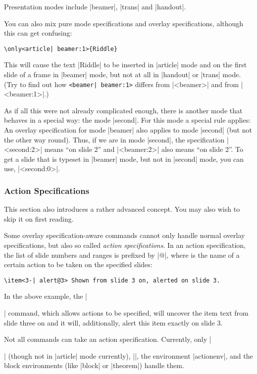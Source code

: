 Presentation modes include |beamer|, |trans| and |handout|.

You can also mix pure mode specifications and overlay specifications, although this can get confusing:
\begin{verbatim}
\only<article| beamer:1>{Riddle}
\end{verbatim}

This will cause the text |Riddle| to be inserted in |article| mode and on the first slide of a frame in |beamer| mode, but not at all in |handout| or |trans| mode. (Try to find out how \verb/<beamer| beamer:1>/ differs from |<beamer>| and from |<beamer:1>|.)

As if all this were not already complicated enough, there is another mode that behaves in a special way: the mode |second|. For this mode a special rule applies: An overlay specification for mode |beamer| also applies to mode |second| (but not the other way round). Thus, if we are in mode |second|, the specification |<second:2>| means ``on slide 2'' and |<beamer:2>| also means ``on slide 2''. To get a slide that is typeset in |beamer| mode, but not in |second| mode, you can use, |<second:0>|.

\subsubsection{Action Specifications}
\label{section-action-specifications}

This section also introduces a rather advanced concept. You may also wish to skip it on first reading.

Some overlay specification-aware commands cannot only handle normal overlay specifications, but also so called \emph{action specifications}. In an action specification, the list of slide numbers and ranges is prefixed by |@|, where  is the name of a certain action to be taken on the specified slides:
\begin{verbatim}
\item<3-| alert@3> Shown from slide 3 on, alerted on slide 3.
\end{verbatim}

In the above example, the |\item| command, which allows actions to be specified, will uncover the item text from slide three on and it will, additionally, alert this item exactly on slide 3.

Not all commands can take an action specification. Currently, only |\item| (though not in |article| mode currently), |\action|, the environment |actionenv|, and the block environments (like |block| or |theorem|) handle them.

